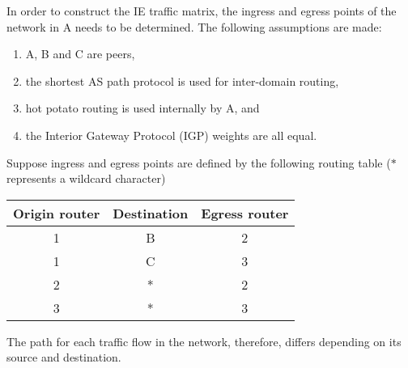 In order to construct the IE traffic matrix, the ingress and egress points of the network in A needs to be determined. The following
assumptions are made:
\begin{enumerate}
\item A, B and C are peers,
\item the shortest AS path protocol is used for inter-domain routing, 
\item hot potato routing is used internally by A, and
\item the Interior Gateway Protocol (IGP) weights are all equal.
\end{enumerate}
Suppose ingress and egress points are defined by the following routing table ($*$ represents a wildcard character)
 \begin{center}
\begin{tabular}{|c|c|c|}
\hline
  \textbf{Origin router} & \textbf{Destination}  & \textbf{Egress router} \\
  \hline
  1 & B & 2  \\
  1 & C & 3  \\
  2 & * & 2 \\
  3 & * & 3 \\
  \hline
\end{tabular}
\end{center}
The path for each traffic flow in the network, therefore, differs depending on its source 
and destination. 

